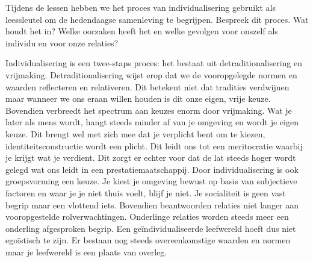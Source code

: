 \documentclass[main.tex]{subfiles}
\begin{document}
\begin{examenvraag}
    \begin{vraag}
        Tijdens de lessen hebben we het proces van individualisering gebruikt als leessleutel om de hedendaagse samenleving te begrijpen. Bespreek dit proces. Wat houdt het in? Welke oorzaken heeft het en welke gevolgen voor onszelf als individu en voor onze relaties?
    \end{vraag}

    \begin{antwoord}
    Individualisering is een twee-staps proces:‭ ‬het bestaat uit detraditionalisering en vrijmaking.‭ 
    Detraditionalisering wijst erop dat we de vooropgelegde normen en waarden reflecteren en 
    relativeren.‭ ‬Dit betekent niet dat tradities verdwijnen maar wanneer we ons eraan willen houden 
    is dit onze eigen,‭ ‬vrije keuze.‭ ‬Bovendien verbreedt het spectrum aan keuzes enorm door 
    vrijmaking.‭ ‬Wat je later als mens wordt,‭ ‬hangt steeds minder af van je omgeving en wordt je 
    eigen keuze.‭ ‬Dit brengt wel met zich mee dat je verplicht bent om te kiezen,‭ 
    ‬identiteitsconstructie wordt een plicht.‭ ‬Dit leidt ons tot een meritocratie waarbij je krijgt 
    wat je verdient.‭ ‬Dit zorgt er echter voor dat de lat steeds hoger wordt gelegd wat ons leidt in 
    een prestatiemaatschappij.‭ ‬Door individualisering is ook groepsvorming een‭ ‬keuze.‭ ‬Je kiest je 
    omgeving bewust op basis van subjectieve factoren en waar je je niet thuis voelt,‭ ‬blijf je 
    niet.‭ ‬Je socialiteit is geen vast begrip maar een vlottend iets.‭ ‬Bovendien beantwoorden 
    relaties niet langer aan vooropgestelde rolverwachtingen.‭ ‬Onderlinge relaties worden steeds 
    meer een onderling afgesproken begrip.‭ ‬Een geïndividualiseerde leefwereld hoeft dus niet 
    egoïstisch te zijn.‭ ‬Er bestaan nog steeds overeenkomstige waarden en normen maar je leefwereld 
    is een plaats van overleg.
    \end{antwoord}
\end{examenvraag}
\end{document}

